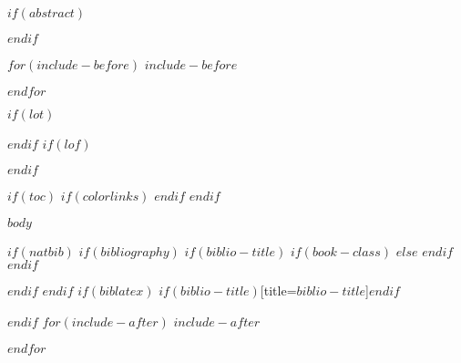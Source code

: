 \documentclass[$if(fontsize)$$fontsize$,$endif$$if(lang)$$babel-lang$,$endif$$if(papersize)$$papersize$paper,$endif$$for(classoption)$$classoption$$sep$,$endfor$]{article}
\begin{document}
\begin{titlepage}
\begin{center}

         \vfill
     \end{center}
    \thispagestyle{empty}
\end{titlepage}

\newpage

\tableofcontents

\newpage


$if(abstract)$
 \begin{abstract}
     $abstract$
 \end{abstract}
 \newpage
$endif$



$for(include-before)$
$include-before$

$endfor$

$if(lot)$
\newpage
\listoftables
$endif$
$if(lof)$
\newpage
\listoffigures
$endif$

$if(toc)$
{
$if(colorlinks)$
\hypersetup{linkcolor=$if(toccolor)$$toccolor$$else$black$endif$}
$endif$
\setcounter{tocdepth}{$toc-depth$}
\newpage
\tableofcontents
}
$endif$

\newpage
{}
$body$

$if(natbib)$
$if(bibliography)$
$if(biblio-title)$
$if(book-class)$
\renewcommand\bibname{$biblio-title$}
$else$
\renewcommand\refname{$biblio-title$}
$endif$
$endif$
\newpage


$endif$
$endif$
$if(biblatex)$
\newpage
\printbibliography$if(biblio-title)$[title=$biblio-title$]$endif$

$endif$
$for(include-after)$
$include-after$

$endfor$
\end{document}
